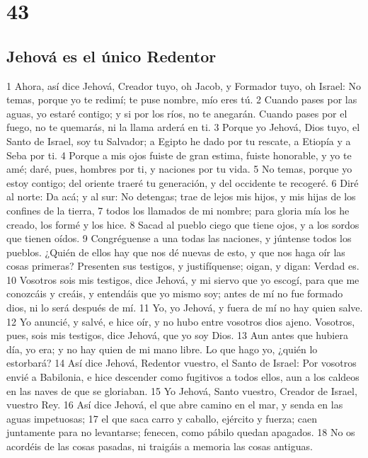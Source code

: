 \chapter{43}

\section*{Jehová es el único Redentor}

1 Ahora, así dice Jehová, Creador tuyo, oh Jacob, y Formador tuyo, oh Israel: No temas, porque yo te redimí; te puse nombre, mío eres tú.
2 Cuando pases por las aguas, yo estaré contigo; y si por los ríos, no te anegarán. Cuando pases por el fuego, no te quemarás, ni la llama arderá en ti.
3 Porque yo Jehová, Dios tuyo, el Santo de Israel, soy tu Salvador; a Egipto he dado por tu rescate, a Etiopía y a Seba por ti.
4 Porque a mis ojos fuiste de gran estima, fuiste honorable, y yo te amé; daré, pues, hombres por ti, y naciones por tu vida.
5 No temas, porque yo estoy contigo; del oriente traeré tu generación, y del occidente te recogeré.
6 Diré al norte: Da acá; y al sur: No detengas; trae de lejos mis hijos, y mis hijas de los confines de la tierra,
7 todos los llamados de mi nombre; para gloria mía los he creado, los formé y los hice.
8 Sacad al pueblo ciego que tiene ojos, y a los sordos que tienen oídos.
9 Congréguense a una todas las naciones, y júntense todos los pueblos. ¿Quién de ellos hay que nos dé nuevas de esto, y que nos haga oír las cosas primeras? Presenten sus testigos, y justifíquense; oigan, y digan: Verdad es.
10 Vosotros sois mis testigos, dice Jehová, y mi siervo que yo escogí, para que me conozcáis y creáis, y entendáis que yo mismo soy; antes de mí no fue formado dios, ni lo será después de mí.
11 Yo, yo Jehová, y fuera de mí no hay quien salve.
12 Yo anuncié, y salvé, e hice oír, y no hubo entre vosotros dios ajeno. Vosotros, pues, sois mis testigos, dice Jehová, que yo soy Dios.
13 Aun antes que hubiera día, yo era; y no hay quien de mi mano libre. Lo que hago yo, ¿quién lo estorbará?
14 Así dice Jehová, Redentor vuestro, el Santo de Israel: Por vosotros envié a Babilonia, e hice descender como fugitivos a todos ellos, aun a los caldeos en las naves de que se gloriaban.
15 Yo Jehová, Santo vuestro, Creador de Israel, vuestro Rey.
16 Así dice Jehová, el que abre camino en el mar, y senda en las aguas impetuosas;
17 el que saca carro y caballo, ejército y fuerza; caen juntamente para no levantarse; fenecen, como pábilo quedan apagados.
18 No os acordéis de las cosas pasadas, ni traigáis a memoria las cosas antiguas.
